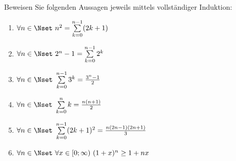 \pagebreak




Beweisen Sie folgenden Aussagen jeweils mittels vollständiger Induktion:\\
\parbox{0.5\textwidth}{\begin{enumerate}
\item $\forall n\in\Nset~n^2=\sum\limits_{k=0}^{n-1} (2k+1)$
\item $\forall n\in\Nset~ 2^n-1=\sum\limits_{k=0}^{n-1} 2^k$
\item $\forall n\in\Nset~\sum\limits_{k=0}^{n-1} 3^k = \frac{3^n-1}{2}$ 
\end{enumerate}}\parbox{0.5\textwidth}{\begin{enumerate}\setcounter{enumi}{3}
\item $\forall n\in\Nset~\sum\limits_{k=0}^n k=\frac{n(n+1)}{2}$ 
\item $\forall n\in\Nset~\sum\limits_{k=0}^{n-1} (2k+1)^2=\frac{n(2n-1)(2n+1)}{3}$
\item $\forall n\in\Nset~\forall x\in[0;\infty)~(1+x)^n\ge 1+nx$
\end{enumerate}}

